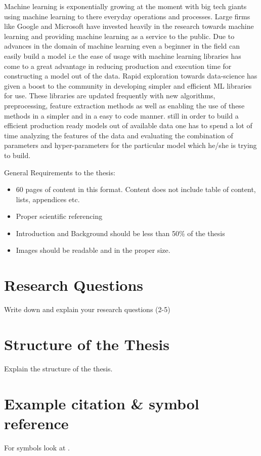 \cite{6147691}

Machine learning is exponentially growing at the moment with big tech giants using machine learning to there everyday operations and processes. Large firms like Google and Microsoft have invested heavily in the research towards machine learning and providing machine learning as a service to the public. Due to advances in the domain of machine learning even a beginner in the field can easily build a model i.e the ease of usage with machine learning libraries has come to a great advantage in reducing production and execution time for constructing a model out of the data. Rapid exploration towards data-science has given a boost to the community in developing simpler and efficient ML libraries for use. These libraries are updated frequently with new algorithms, preprocessing, feature extraction methods as well as enabling the use of these methods in a simpler and in a easy to code manner. still in order to build a efficient production ready models out of available data one has to spend a lot of time analyzing the features of the data and evaluating the combination of parameters and hyper-parameters for the particular model which he/she is trying to build.

General Requirements to the thesis:

\begin{itemize}
	\item 60 pages of content in this format. Content does not include table of content, lists, appendices etc.
	\item Proper scientific referencing
	\item Introduction and Background should be less than 50\% of the thesis
	\item Images should be readable and in the proper size. 
\end{itemize}


\section{Research Questions}

Write down and explain your research questions (2-5)

\section{Structure of the Thesis}

Explain the structure of the thesis. 

\section{Example citation \& symbol reference}\label{sec:citation}
For symbols look at \cite{latex_symbols_2017}.


